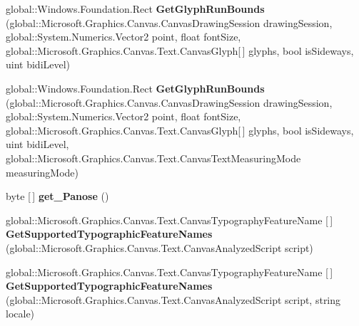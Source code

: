\begin{DoxyCompactItemize}
global\+::\+Windows.\+Foundation.\+Rect {\bfseries Get\+Glyph\+Run\+Bounds} (global\+::\+Microsoft.\+Graphics.\+Canvas.\+Canvas\+Drawing\+Session drawing\+Session, global\+::\+System.\+Numerics.\+Vector2 point, float font\+Size, global\+::\+Microsoft.\+Graphics.\+Canvas.\+Text.\+Canvas\+Glyph\mbox{[}$\,$\mbox{]} glyphs, bool is\+Sideways, uint bidi\+Level)
\item 
\mbox{\label{class_microsoft_1_1_graphics_1_1_canvas_1_1_text_1_1_canvas_font_face_a76b264702a6d7f86be15073bab70e8ac}} 
global\+::\+Windows.\+Foundation.\+Rect {\bfseries Get\+Glyph\+Run\+Bounds} (global\+::\+Microsoft.\+Graphics.\+Canvas.\+Canvas\+Drawing\+Session drawing\+Session, global\+::\+System.\+Numerics.\+Vector2 point, float font\+Size, global\+::\+Microsoft.\+Graphics.\+Canvas.\+Text.\+Canvas\+Glyph\mbox{[}$\,$\mbox{]} glyphs, bool is\+Sideways, uint bidi\+Level, global\+::\+Microsoft.\+Graphics.\+Canvas.\+Text.\+Canvas\+Text\+Measuring\+Mode measuring\+Mode)
\item 
\mbox{\label{class_microsoft_1_1_graphics_1_1_canvas_1_1_text_1_1_canvas_font_face_aabf184fee746021f37afff4cd11861b0}} 
byte \mbox{[}$\,$\mbox{]} {\bfseries get\+\_\+\+Panose} ()
\item 
\mbox{\label{class_microsoft_1_1_graphics_1_1_canvas_1_1_text_1_1_canvas_font_face_adcab0286e27de35e3d924abfbadc35e2}} 
global\+::\+Microsoft.\+Graphics.\+Canvas.\+Text.\+Canvas\+Typography\+Feature\+Name \mbox{[}$\,$\mbox{]} {\bfseries Get\+Supported\+Typographic\+Feature\+Names} (global\+::\+Microsoft.\+Graphics.\+Canvas.\+Text.\+Canvas\+Analyzed\+Script script)
\item 
\mbox{\label{class_microsoft_1_1_graphics_1_1_canvas_1_1_text_1_1_canvas_font_face_ad0a7590dc7c0440edef17858e30d976b}} 
global\+::\+Microsoft.\+Graphics.\+Canvas.\+Text.\+Canvas\+Typography\+Feature\+Name \mbox{[}$\,$\mbox{]} {\bfseries Get\+Supported\+Typographic\+Feature\+Names} (global\+::\+Microsoft.\+Graphics.\+Canvas.\+Text.\+Canvas\+Analyzed\+Script script, string locale)
\item 
\mbox{\label{class_microsoft_1_1_graphics_1_1_canvas_1_1_text_1_1_canvas_font_face_a6b78ca90d54be6ec99a39ea2e3950498}} 

\end{DoxyCompactItemize}
